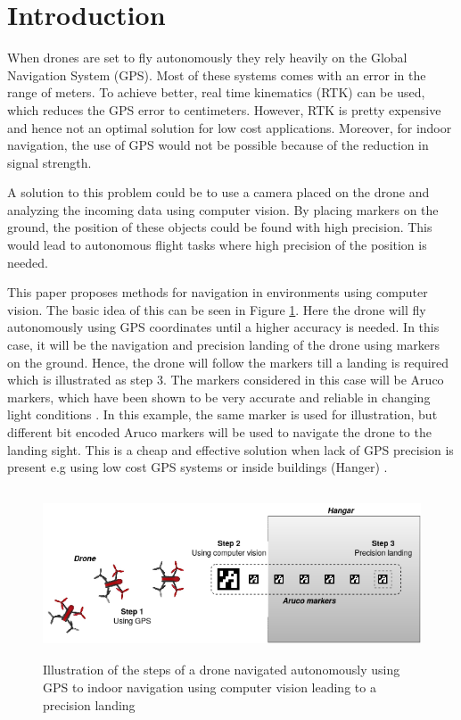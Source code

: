 \documentclass[../Head/Report.tex]{subfiles}
\begin{document}
\section{Introduction}


When drones are set to fly autonomously they rely heavily on the Global Navigation System (GPS). Most of these systems comes with an error in the range of meters. To achieve better, real time kinematics (RTK) can be used, which reduces the GPS error to centimeters. However, RTK is pretty expensive and hence not an optimal solution for low cost applications. Moreover, for indoor navigation, the use of GPS would not be possible because of the  reduction in signal strength. 

A solution to this problem could be to use a camera placed on the drone and analyzing the incoming data using computer vision. By placing markers on the ground, the position of these objects could be found with high precision. This would lead to autonomous flight tasks where high precision of the position is needed.      

This paper proposes methods for navigation in environments using computer vision. The basic idea of this can be seen in Figure \ref{fig:masterProjectIllustration}. Here the drone will fly autonomously using GPS coordinates until a higher accuracy is needed. In this case, it will be the navigation and precision landing of the drone using markers on the ground. Hence, the drone will follow the markers till a landing is required which is illustrated as step 3. The markers considered in this case will be Aruco markers, which have been shown to be very accurate and reliable in changing light conditions \cite{visualmarkers}. In this example, the same marker is used for illustration, but different bit encoded Aruco markers will be used to navigate the drone to the landing sight. This is a cheap and effective solution when lack of GPS precision is present e.g using low cost GPS systems or inside buildings (Hanger) \cite{Visual-Inertial-Navigation}. 

\begin{figure}[H]
	\centering
	\includegraphics[height=5cm]{../Figures/masterProjectIllustration.png}
	\captionsetup{justification=centering}
    \caption{Illustration of the steps of a drone navigated autonomously using GPS to indoor navigation using computer vision leading to a precision landing }
    \label{fig:masterProjectIllustration}
\end{figure}
\end{document}
